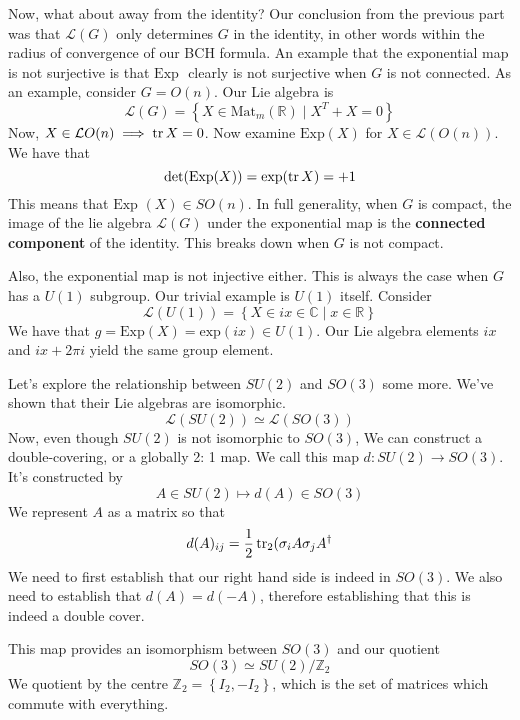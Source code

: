 \documentclass[11pt, oneside]{article}   	%
\theoremstyle{slanted}
\begin{document}
Now, what about away from the identity? 
Our conclusion from the previous part was that $ \mathcal{ L } ( G ) $ 
only determines $ G $ in the identity, in other words within the 
radius of convergence of our BCH formula. 
An example that the exponential map is not surjective is that 
 $ \text{Exp  } $ clearly is not surjective when $ G $ is not connected. 
 As an example, consider $ G = O ( n ) $. Our Lie algebra is 
 \[
	 \mathcal{ L } ( G )  = \left\{  X \in \text{Mat}_m ( \mathbb{ R }) \mid X^ T + X = 0  \right\} 
 \]   Now, $ X \in \mathcal{ L } O ( n ) \implies \tr X = 0 $. Now 
 examine $ \text{Exp} ( X)  $ for $ X \in \mathcal{ L } ( O ( n ) ) $. 
 We have that 
 \[
	 \det ( \text{Exp} ( X) ) = \text{exp} ( \tr X )  = + 1 
 \] This means that $ \text{Exp } ( X) \in SO ( n ) $. 
 In full generality, when $ G $ is compact, the image of 
 the lie algebra $ \mathcal{ L } ( G ) $ under the exponential map 
 is the \textbf{connected component} of the identity. 
This breaks down when $ G $ is not compact. 

Also, the exponential map is not 
injective either. This is always the case when $ G $ has a $ U ( 1) $ 
subgroup. Our trivial example is $ U ( 1 ) $ itself. 
Consider 
\[
	\mathcal{ L } ( U ( 1) )  = \left\{  X \in i x \in \mathbb{ C} \mid x \in \mathbb{ R}  \right\} 
\] We have that  $ g  = \text{Exp}( X )  = \text{exp}( i x ) \in U ( 1)  $. 
Our Lie algebra elements $ i x $ and $ i x + 2 \pi i $ yield 
the same group element. 

Let's explore the relationship between $ SU ( 2 )  $ and $ SO ( 3  ) $ 
some more. We've shown that their Lie algebras are isomorphic. 
\[
	\mathcal{ L } ( SU ( 2 ) ) \simeq \mathcal{ L } ( SO ( 3) ) 
\] Now, even though $ SU (2 )$ is not isomorphic to $ SO ( 3)$, 
We can construct a double-covering, or a globally 2: 1 map. 
We call this map $ d : SU ( 2 ) \to SO ( 3) $. 
It's constructed by 
 \[
 A \in SU ( 2) \mapsto d ( A ) \in SO ( 3 ) 
\] We represent $ A $ as a matrix so that 
 \[
	 d ( A)_{ ij }  = \frac{1}{2 } \tr_{2 } ( \sigma_i A \sigma_{ j } A^ \dagger 
 \]  We need to first establish that our right hand side is indeed in 
 $ SO ( 3)  $. We also need to establish that 
 $ d ( A )  = d ( - A ) $, therefore establishing that this is 
 indeed a double cover. 

 This map provides an isomorphism between $ SO ( 3)  $ 
 and our quotient 
 \[
  SO ( 3) \simeq SU ( 2 ) / \mathbb{ Z}_2 
 \] We quotient by the centre $ \mathbb { Z} _ 2  = \left\{  I_2 , - I_ 2  \right\}  $, 
 which is the set of matrices which commute with everything. 
\end{document}
